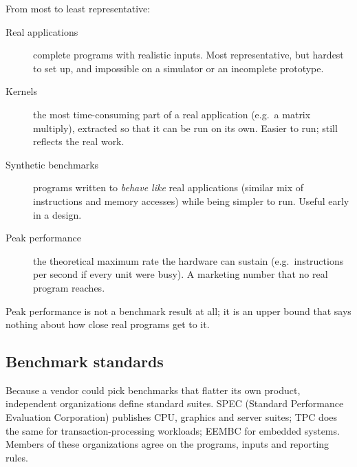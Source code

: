 \documentclass[../main.tex]{subfiles}
\begin{document}
From most to least representative:
\begin{description}
  \item[Real applications] complete programs with realistic inputs.  Most
    representative, but hardest to set up, and impossible on a simulator or
    an incomplete prototype.
  \item[Kernels] the most time-consuming part of a real application (e.g.\ a
    matrix multiply), extracted so that it can be run on its own.  Easier to run; still reflects the real work.
  \item[Synthetic benchmarks] programs written to \emph{behave like} real
    applications (similar mix of instructions and memory accesses) while
    being simpler to run.  Useful early in a
    design.
  \item[Peak performance] the theoretical maximum rate the hardware can
    sustain (e.g.\ instructions per second if every unit were busy).  A
    marketing number that no real program reaches.
\end{description}

\begin{note}
  Peak performance is not a benchmark result at all; it is an upper bound
  that says nothing about how close real programs get to it.
\end{note}

\subsection{Benchmark standards}

Because a vendor could pick benchmarks that flatter its own product,
independent organizations define standard suites.  SPEC (Standard Performance Evaluation Corporation)
publishes CPU, graphics and server suites; TPC does the same for
transaction-processing workloads; EEMBC for embedded systems.  Members of
these organizations agree on the programs, inputs and reporting
rules.
\end{document}
